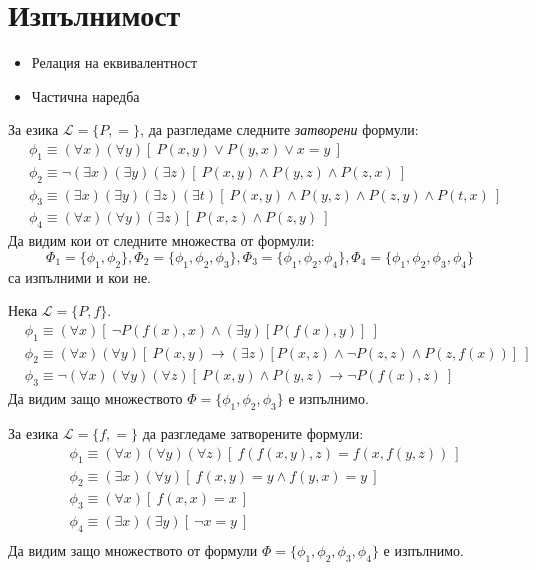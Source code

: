 \section{Изпълнимост}

\begin{itemize}
\item
  Релация на еквивалентност
\item
  Частична наредба
\end{itemize}


\begin{example}
  За езика $\mathcal{L} = \{P,=\}$, да разгледаме следните \emph{затворени} формули:
  \begin{align*}
    & \phi_1 \equiv (\forall x)(\forall y)[\ P(x,y) \lor P(y,x) \lor x = y\ ]\\
    & \phi_2 \equiv \neg (\exists x)(\exists y)(\exists z)[\ P(x,y) \land P(y,z) \land P(z,x)\ ]\\
    & \phi_3 \equiv (\exists x)(\exists y)(\exists z)(\exists t)[\ P(x,y) \land P(y,z) \land P(z,y) \land P(t,x)\ ]\\
    & \phi_4 \equiv (\forall x)(\forall y)(\exists z)[\ P(x,z) \land P(z,y)\ ]
  \end{align*}
  Да видим кои от следните множества от формули:
  \[\Phi_1 = \{\phi_1,\phi_2\}, \Phi_2 = \{\phi_1, \phi_2, \phi_3\}, \Phi_3 = \{ \phi_1, \phi_2, \phi_4\}, \Phi_4 = \{\phi_1,\phi_2,\phi_3,\phi_4\}\]
  са изпълними и кои не.
\end{example}

\begin{example}
  Нека $\mathcal{L} = \{P, f\}$.
  \begin{align*}
    & \phi_1 \equiv (\forall x)[\ \neg P(f(x),x) \land (\exists y)[P(f(x),y)]\ ]\\
    & \phi_2 \equiv (\forall x)(\forall y)[\ P(x,y) \to (\exists z)[P(x,z) \land \neg P(z,z) \land P(z,f(x))]\ ]\\
    & \phi_3 \equiv \neg (\forall x)(\forall y)(\forall z)[\ P(x,y) \land P(y,z) \to \neg P(f(x), z)\ ]
  \end{align*}
  Да видим защо множеството $\Phi = \{\phi_1,\phi_2,\phi_3\}$ е изпълнимо.
\end{example}

\begin{example}
  За езика $\mathcal{L} = \{f,=\}$ да разгледаме затворените формули:
  \begin{align*}
    & \phi_1 \equiv (\forall x)(\forall y)(\forall z)[\ f(f(x,y),z) = f(x, f(y,z))\ ]\\
    & \phi_2 \equiv (\exists x)(\forall y)[\ f(x,y) = y \land f(y,x) = y\ ]\\
    & \phi_3 \equiv (\forall x)[\ f(x,x) = x\ ]\\
    & \phi_4 \equiv (\exists x)(\exists y)[\ \neg x = y\ ]\\
  \end{align*}
  Да видим защо множеството от формули $\Phi = \{\phi_1,\phi_2,\phi_3,\phi_4\}$ е изпълнимо.
\end{example}




